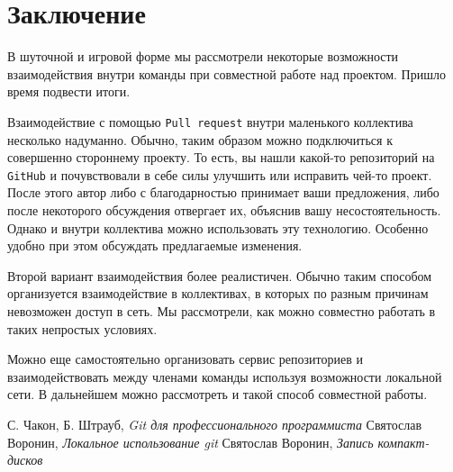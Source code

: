 \documentclass[14pt,a4paper]{article}
\begin{document}
\section{Заключение}
В шуточной и игровой форме мы рассмотрели некоторые возможности взаимодействия внутри команды
при совместной работе над проектом. Пришло время подвести итоги.

Взаимодействие с помощью \texttt{Pull request} внутри маленького коллектива несколько
надуманно. Обычно, таким образом можно подключиться к совершенно стороннему проекту. 
То есть, вы нашли какой-то репозиторий на \texttt{GitHub}  и почувствовали в себе силы
улучшить или исправить чей-то проект. После этого автор либо с благодарностью принимает
ваши предложения, либо после некоторого обсуждения отвергает их, объяснив вашу несостоятельность.
Однако и внутри коллектива можно использовать эту технологию. Особенно удобно при этом
обсуждать предлагаемые изменения.

Второй вариант взаимодействия более реалистичен. Обычно таким способом организуется взаимодействие
в коллективах, в которых по разным причинам невозможен доступ в сеть. Мы рассмотрели, как
можно совместно работать в таких непростых условиях. 

Можно еще самостоятельно организовать сервис репозиториев и взаимодействовать между членами
команды используя возможности локальной сети. В дальнейшем можно рассмотреть и такой способ
совместной работы.

\begin{thebibliography}{99}
	С. Чакон, Б. Штрауб, \emph{Git для профессионального программиста}
	Святослав Воронин, \emph{Локальное использование git}
	Святослав Воронин, \emph{Запись компакт-дисков}
\end{thebibliography}
\end{document}
